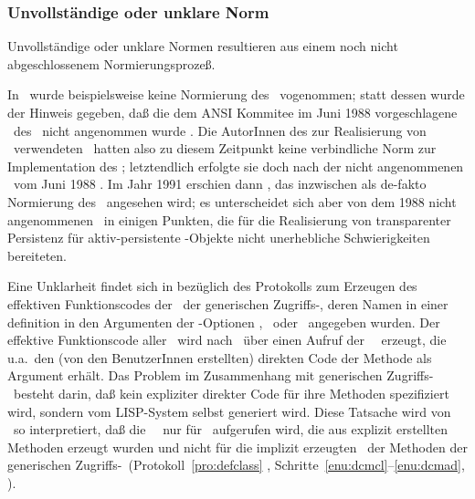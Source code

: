 \subsubsection{Unvollst\"{a}ndige oder unklare Norm}
%
Unvollst\"{a}ndige oder unklare Normen resultieren aus einem noch nicht
abgeschlossenem Normierungsproze\ss{}.
%
\par{}In \cite{bib:st90}\ wurde beispielsweise keine Normierung des
\mop\ vogenommen; statt dessen wurde der Hinweis gegeben, da\ss{} die
dem ANSI Kommitee im Juni 1988 vorgeschlagene \std[isierung]\ des
\mop\ nicht angenommen wurde . Die AutorInnen des zur
Realisierung von \plob\ verwendeten \lwcl\ hatten also zu diesem
Zeitpunkt keine verbindliche Norm zur Implementation des \mop;
letztendlich erfolgte sie doch nach der nicht angenommenen
\std[isierung]\ vom Juni 1988 \cite{bib:sn94}. Im Jahr 1991 erschien
dann \cite{bib:amop91}, das inzwischen als de-fakto Normierung des
\mop\ angesehen wird; es unterscheidet sich aber von dem 1988 nicht
angenommenen \std\ in einigen Punkten, die f\"{u}r die Realisierung von
transparenter Persistenz f\"{u}r aktiv-persistente \clos-Objekte nicht
unerhebliche Schwierigkeiten bereiteten.
%
\par{}Eine Unklarheit findet sich in
\cite{bib:amop91} bez\"{u}glich des Protokolls zum Erzeugen des
effektiven Funktionscodes der \mtdmo[e]\ der generischen
Zugriffs-\fn[en], deren Namen in einer
\cls[n]definition in den Argumenten der \Slt\/-Optionen
, \ oder \ angegeben
wurden. Der effektive Funktionscode aller \mtdmo[e]\ wird nach
\ \"{u}ber einen Aufruf der
\gfn[n]\ \ erzeugt, die u.a.\ den (von den
BenutzerInnen erstellten) direkten Code der Methode als Argument
erh\"{a}lt. Das Problem im Zusammenhang mit generischen
Zugriffs-\fn[en]\ besteht darin, da\ss{} kein expliziter direkter Code
f\"{u}r ihre Methoden spezifiziert wird, sondern vom LISP-System selbst
generiert wird. Diese Tatsache wird von \lw\ so
interpretiert, da\ss{} die \gfn\ \ nur f\"{u}r
\mtdmo[e]\ aufgerufen wird, die aus explizit
erstellten Methoden erzeugt wurden und nicht f\"{u}r die implizit
erzeugten \mtdmo[e]\ der Methoden der generischen
Zugriffs-\fn[en]\ifbericht\else\ (Protokoll~\ref{pro:defclass}
, Schritte~\ref{enu:dcmcl}--\ref{enu:dcmad},
\citepage{\pageref{enu:dcmcl}})\fi.
%
